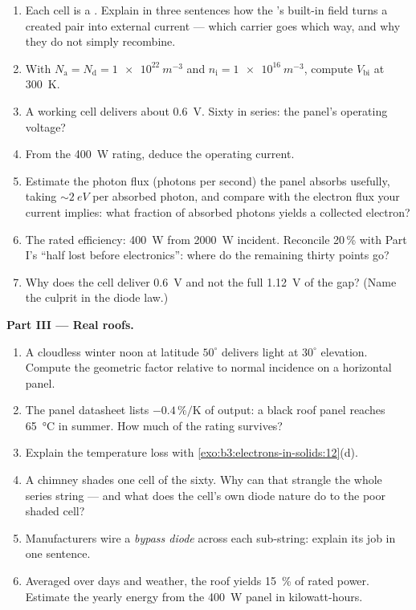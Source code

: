 \begin{problem}
\begin{enumerate}[resume]
  \item Each cell is a . Explain in three sentences
        how the 's built-in field turns a created
        pair into external current --- which carrier goes which
        way, and why they do not simply recombine.
  \item With $N_{\text{a}} = N_{\text{d}} = \qty{1e22}{m^{-3}}$
        and $n_{\text{i}} = \qty{1e16}{m^{-3}}$, compute
        $V_{\text{bi}}$ at \qty{300}{K}.
  \item A working cell delivers about \qty{0.6}{V}. Sixty in
        series: the panel's operating voltage?
  \item From the \qty{400}{W} rating, deduce the operating
        current.
  \item Estimate the photon flux (photons per second) the panel
        absorbs usefully, taking $\sim\qty{2}{eV}$ per absorbed
        photon, and compare with the electron flux your current
        implies: what fraction of absorbed photons yields a
        collected electron?
  \item The rated efficiency: \qty{400}{W} from
        \qty{2000}{W} incident. Reconcile 20\,\% with Part I's
        ``half lost before electronics'': where do the remaining
        thirty points go?
  \item Why does the cell deliver \qty{0.6}{V} and not the full
        \qty{1.12}{V} of the gap? (Name the culprit in the diode
        law.)
\end{enumerate}

\medskip\noindent\textbf{Part III --- Real roofs.}

\begin{enumerate}[resume]
  \item A cloudless winter noon at latitude $50^\circ$ delivers
        light at $30^\circ$ elevation. Compute the geometric
        factor relative to normal incidence on a horizontal
        panel.
  \item The panel datasheet lists $-0.4\,\%/\text{K}$ of output:
        a black roof panel reaches \qty{65}{\celsius} in summer.
        How much of the rating survives?
  \item Explain the temperature loss with
        \cref{exo:b3:electrons-in-solids:12}(d).
  \item A chimney shades one cell of the sixty. Why can that
        strangle the whole series string --- and what does the
        cell's own diode nature do to the poor shaded cell?
  \item Manufacturers wire a \emph{bypass diode} across each
        sub-string: explain its job in one sentence.
  \item Averaged over days and weather, the roof yields
        \qty{15}{\percent} of rated power. Estimate the yearly
        energy from the \qty{400}{W} panel in kilowatt-hours.
\end{enumerate}


\end{problem}
